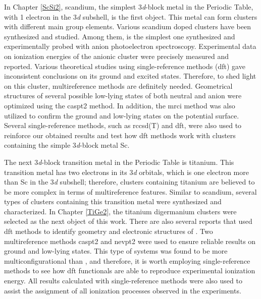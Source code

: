 \begin{refsection}
In Chapter \ref{ScSi2}, scandium, the simplest 3\textit{d}-block metal in the Periodic Table, with 1 electron in the 3\textit{d} subshell, is the first object. This metal can form clusters with different main group elements. \cite{c1:6, c1:7, c1:8, c1:9} Various scandium doped clusters have been synthesized and studied. Among them,  is the simplest one synthesized and experimentally probed with anion photoelectron spectroscopy. Experimental data on ionization energies of the anionic cluster  were precisely measured and reported. Various theoretical studies using single-reference methods (\acrshort{dft}) gave inconsistent conclusions on its ground and excited states. Therefore, to shed light on this cluster, multireference methods are definitely needed. Geometrical structures of several possible low-lying states of both neutral and anion were optimized using the \acrshort{caspt2} method. In addition, the \acrshort{mrci} method was also utilized to confirm the ground and low-lying states on the potential surface. Several single-reference methods, such as \acrshort{rccsd}(T) and \acrshort{dft}, were also used to reinforce our obtained results and test how \acrshort{dft} methods work with clusters containing the simple 3\textit{d}-block metal Sc. 




The next 3\textit{d}-block transition metal in the Periodic Table is titanium. This transition metal has two electrons in its 3\textit{d} orbitals, which is one electron more than Sc in the 3\textit{d} subshell; therefore, clusters containing titanium are believed to be more complex in terms of multireference features. Similar to scandium, several types of clusters containing this transition metal were synthesized and characterized. \cite{c1:10, c1:11, c1:12, c1:13, c1:14, c1:15} In Chapter \ref{TiGe2}, the titanium digermanium clusters  were selected as the next object of this work. There are also several reports that used \acrshort{dft} methods to identify geometry and electronic structures of . Two multireference methods \acrshort{caspt2} and \acrshort{nevpt2} were used to ensure reliable results on ground and low-lying states. This type of systems was found to be more multiconfigurational than , and therefore, it is worth employing single-reference methods to see how \acrshort{dft} functionals are able to reproduce experimental ionization energy. All results calculated with single-reference methods were also used to assist the assignment of all ionization processes observed in the experiments.






\end{refsection}
